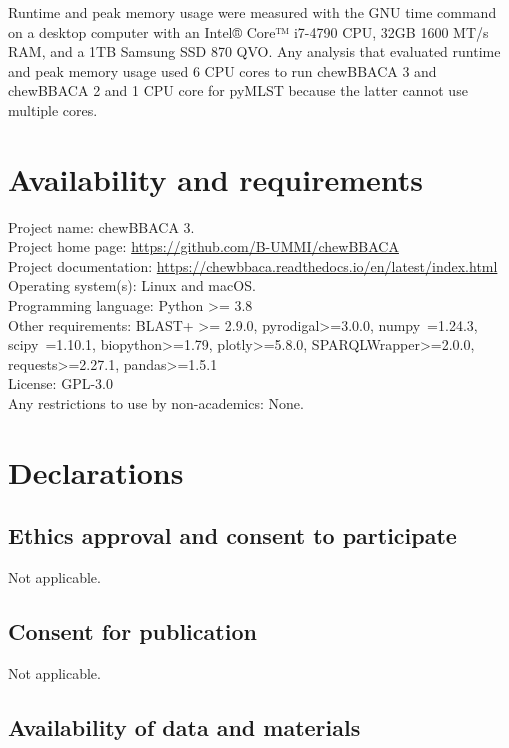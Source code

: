 Runtime and peak memory usage were measured with the GNU time command on a desktop computer with an Intel® Core™ i7-4790 CPU, 32GB 1600 MT/s RAM, and a 1TB Samsung SSD 870 QVO. Any analysis that evaluated runtime and peak memory usage used 6 CPU cores to run chewBBACA 3 and chewBBACA 2 and 1 CPU core for pyMLST because the latter cannot use multiple cores.

\section{Availability and requirements} \label{sec:availability_and_requirements}

\noindent Project name: chewBBACA 3.\\
Project home page: \url{https://github.com/B-UMMI/chewBBACA}\\
Project documentation: \url{https://chewbbaca.readthedocs.io/en/latest/index.html}\\
Operating system(s): Linux and macOS.\\
Programming language: Python >= 3.8\\
Other requirements: BLAST+ >= 2.9.0, pyrodigal>=3.0.0, numpy~=1.24.3, scipy~=1.10.1, biopython>=1.79, plotly>=5.8.0, SPARQLWrapper>=2.0.0, requests>=2.27.1, pandas>=1.5.1\\
License: GPL-3.0\\
Any restrictions to use by non-academics: None.

\section{Declarations} \label{sec:declarations}

\subsection{Ethics approval and consent to participate} \label{ssec:declarations_ssec1}

\noindent Not applicable.

\subsection{Consent for publication} \label{ssec:declarations_ssec2}

\noindent Not applicable.

\subsection{Availability of data and materials} \label{ssec:declarations_ssec3}


